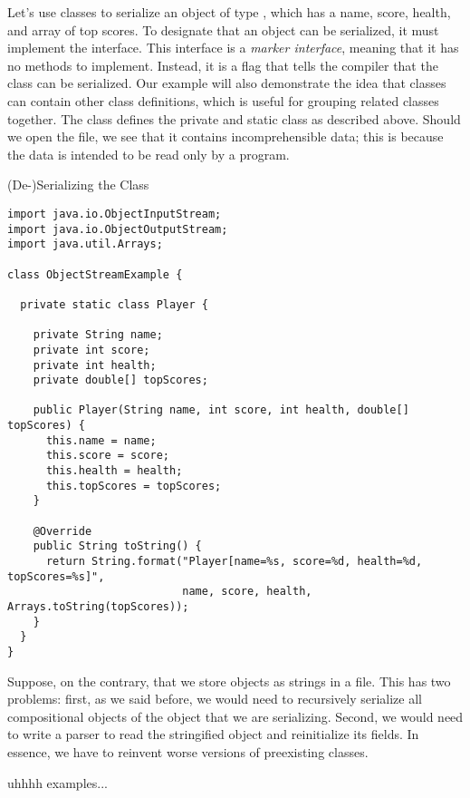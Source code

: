 \example Let's use  classes to serialize an object of type , which has a name, score, health, and array of top scores. To designate that an object can be serialized, it must implement the  interface. This interface is a \textit{marker interface}, meaning that it has no methods to implement. Instead, it is a flag that tells the compiler that the class can be serialized. Our example will also demonstrate the idea that classes can contain other class definitions, which is useful for grouping related classes together. The  class defines the private and static  class as described above. Should we open the  file, we see that it contains incomprehensible data; this is because the data is intended to be read only by a program. 

\begin{cl}{(De-)Serializing the  Class}
\begin{lstlisting}[language=MyJava]
import java.io.ObjectInputStream;
import java.io.ObjectOutputStream;
import java.util.Arrays;

class ObjectStreamExample {

  private static class Player {

    private String name;
    private int score;
    private int health;
    private double[] topScores;
    
    public Player(String name, int score, int health, double[] topScores) {
      this.name = name;
      this.score = score;
      this.health = health;
      this.topScores = topScores;
    }
    
    @Override
    public String toString() {
      return String.format("Player[name=%s, score=%d, health=%d, topScores=%s]", 
                           name, score, health, Arrays.toString(topScores));
    }
  }
}
\end{lstlisting}
\end{cl}

Suppose, on the contrary, that we store objects as strings in a file. This has two problems: first, as we said before, we would need to recursively serialize all compositional objects of the object that we are serializing. Second, we would need to write a parser to read the stringified object and reinitialize its fields. In essence, we have to reinvent worse versions of preexisting classes.

\example uhhhh  examples...


